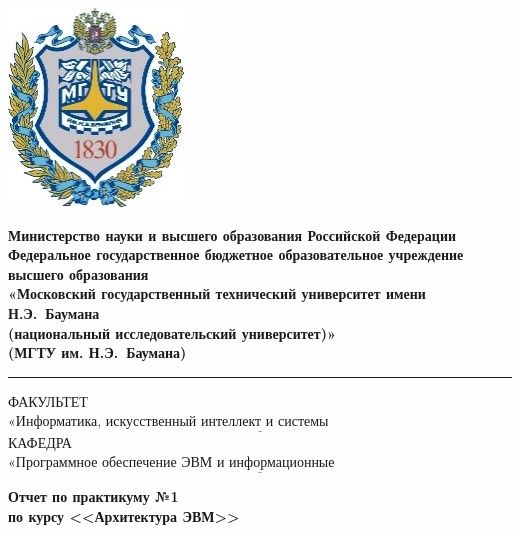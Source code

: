 
\begin{titlepage}
	\fontsize{12pt}{12pt}\selectfont
	\noindent \begin{minipage}{0.15\textwidth}
		\includegraphics[scale=0.15]{inc/img/bmstu}
	\end{minipage}
	\noindent\begin{minipage}{0.9\textwidth}\centering
		\textbf{Министерство науки и высшего образования Российской Федерации}\\
		\textbf{Федеральное государственное бюджетное образовательное учреждение высшего образования}\\
		\textbf{«Московский государственный технический университет имени Н.Э.~Баумана}\\
		\textbf{(национальный исследовательский университет)»}\\
		\textbf{(МГТУ им. Н.Э.~Баумана)}
	\end{minipage}
	
	\noindent\rule{18cm}{3pt}
	\newline\newline
	\noindent ФАКУЛЬТЕТ $\underline{\text{«Информатика, искусственный интеллект и системы управления»~~~~~~~~~~~~~~~~~~~~~~~~~~~~~~~~~~~}}$ \newline\newline
	\noindent КАФЕДРА $\underline{\text{«Программное обеспечение ЭВМ и информационные технологии»~~~~~~~~~~~~~~~~~~~~~~~~~~~~~~~~~~~~~~}}$\newline\newline\newline\newline
	
	\vspace{2.5cm}
	\begin{center}
		\Large\textbf{Отчет по практикуму №1}\\
		\Large\textbf {по курсу <<Архитектура ЭВМ>>}\\
	\end{center}
	

\end{titlepage}
